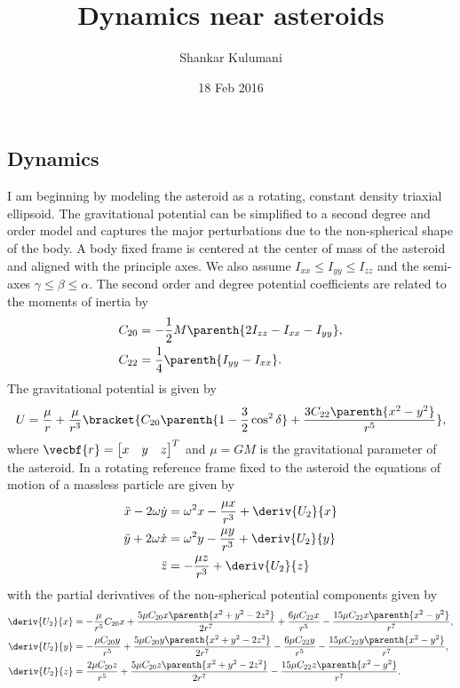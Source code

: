 \documentclass[11pt, reqno]{article}   	%
\title{Dynamics near asteroids}
\author{Shankar Kulumani}
\date{18 Feb 2016}							%
\begin{document}
\maketitle

\subsection*{Dynamics}

I am beginning by modeling the asteroid as a rotating, constant density triaxial ellipsoid. 
The gravitational potential can be simplified to a second degree and order model and captures the major perturbations due to the non-spherical shape of the body.
A body fixed frame is centered at the center of mass of the asteroid and aligned with the principle axes. 
We also assume \( I_{xx} \leq I_{yy} \leq I_{zz} \) and the semi-axes \( \gamma \leq \beta \leq \alpha \).
The second order and degree potential coefficients are related to the moments of inertia by 
\begin{align*}
	C_{20} &= -\frac{1}{2} M \parenth{2 I_{zz} - I_{xx} - I_{yy}} , \\
	C_{22} &=  \frac{1}{4} \parenth{I_{yy} - I_{xx}} .
\end{align*}
The gravitational potential is given by
\begin{align*}
	U = \frac{\mu}{r} + \frac{\mu}{r^3} \bracket{C_{20} \parenth{1-\frac{3}{2} \cos^2 \delta} + \frac{3 C_{22} \parenth{x^2 - y^2}}{r^5} } ,
\end{align*}
where \( \vecbf{r} = \begin{bmatrix} x & y & z \end{bmatrix}^T \) and \( \mu = G M \) is the gravitational parameter of the asteroid.
In a rotating reference frame fixed to the asteroid the equations of motion of a massless particle are given by
\begin{align*}
	\ddot{x} - 2 \omega \dot{y} &= \omega^2 x - \frac{\mu x}{r^3} + \deriv{U_2}{x} \\
	\ddot{y} + 2 \omega \dot{x} &= \omega^2 y - \frac{\mu y}{r^3} + \deriv{U_2}{y} \\
	\ddot{z} &= -\frac{\mu z}{r^3} + \deriv{U_2}{z} 
\end{align*}
with the partial derivatives of the non-spherical potential components given by
\begin{align*}
	\deriv{U_2}{x} &= -\frac{\mu}{r^5} C_{20} x + \frac{5 \mu C_{20} x \parenth{x^2 + y^2 - 2 z^2}}{2 r^7} + \frac{6 \mu C_{22}x}{r^5} - \frac{15 \mu C_{22} x \parenth{x^2 - y^2}}{r^7} , \\
	\deriv{U_2}{y} &= -\frac{\mu C_{20} y}{r^5} + \frac{5 \mu C_{20} y \parenth{x^2+y^2-2z^2}}{2 r^7} - \frac{6 \mu C_{22}y}{r^5} - \frac{15 \mu C_{22} y \parenth{x^2 - y^2}}{r^7}, \\
	\deriv{U_2}{z} &= \frac{2 \mu C_{20} z}{r^5} + \frac{5 \mu C_{20} z \parenth{x^2 + y^2 - 2 z^2}}{2 r^7} - \frac{15 \mu C_{22} z \parenth{x^2-y^2}}{r^7}.
\end{align*}
\end{document}
